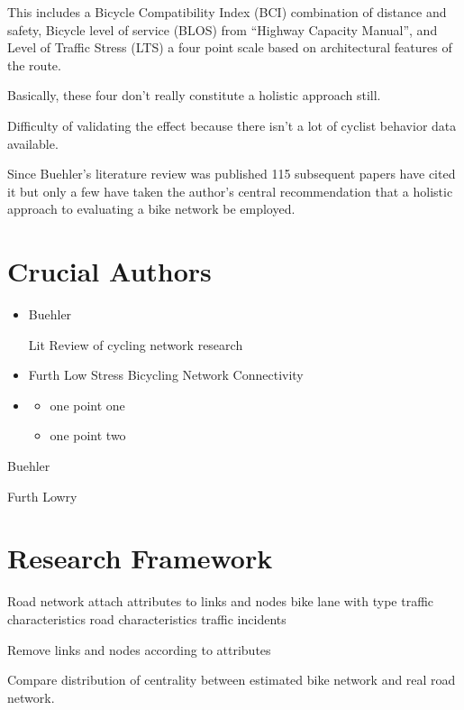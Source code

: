 \documentclass[11pt]{article} %
\begin{document}
	This includes a Bicycle Compatibility Index (BCI) combination of distance and safety, Bicycle level of service (BLOS) from ``Highway Capacity Manual'', \cite{Lowry} and Level of Traffic Stress (LTS) \cite{Mekuria and Furth} a four point scale based on architectural features of the route.
	
	Basically, these four don't really constitute a holistic approach still. 
	
	Difficulty of validating the effect because there isn't a lot of cyclist behavior data available.
	
	
Since Buehler's literature review was published 115 subsequent papers have cited it but only a few have taken the author's central recommendation that a holistic approach to evaluating a bike network be employed. 
	
	
	
\section{Crucial Authors}



\begin{itemize}
\item Buehler \cite{Buehler2016}

Lit Review of cycling network research

\item Furth Low Stress Bicycling Network Connectivity

\item 
  \begin{itemize}
  \item one point one
  \item one point two
  \end{itemize}
\end{itemize}

Buehler

Furth
Lowry
	
	
	
\section{Research Framework}

Road network
	attach attributes to links and nodes
		bike lane with type
		traffic characteristics
		road characteristics
		traffic incidents
		
Remove links and nodes according to attributes

Compare distribution of centrality between estimated bike network and real road network. 
\end{document}
